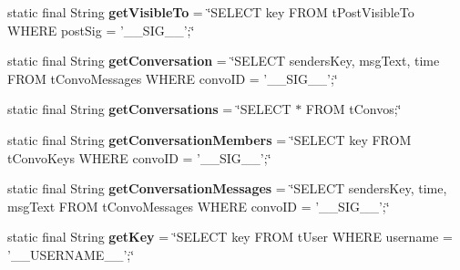 \begin{DoxyCompactItemize}
\item 
\hypertarget{classballmerpeak_1_1turtlenet_1_1server_1_1DBStrings_a977f96408405a039b29ea0375f014129}{static final String {\bfseries get\-Visible\-To} = \char`\"{}S\-E\-L\-E\-C\-T key F\-R\-O\-M t\-Post\-Visible\-To W\-H\-E\-R\-E post\-Sig = '\-\_\-\-\_\-\-S\-I\-G\-\_\-\-\_\-';\char`\"{}}\label{classballmerpeak_1_1turtlenet_1_1server_1_1DBStrings_a977f96408405a039b29ea0375f014129}

\item 
\hypertarget{classballmerpeak_1_1turtlenet_1_1server_1_1DBStrings_a764e619962ecc020606b3f8b2f3068dd}{static final String {\bfseries get\-Conversation} = \char`\"{}S\-E\-L\-E\-C\-T senders\-Key, msg\-Text, time F\-R\-O\-M t\-Convo\-Messages W\-H\-E\-R\-E convo\-I\-D = '\-\_\-\-\_\-\-S\-I\-G\-\_\-\-\_\-';\char`\"{}}\label{classballmerpeak_1_1turtlenet_1_1server_1_1DBStrings_a764e619962ecc020606b3f8b2f3068dd}

\item 
\hypertarget{classballmerpeak_1_1turtlenet_1_1server_1_1DBStrings_a329ba6510f891c7ff5a45117bb13c46f}{static final String {\bfseries get\-Conversations} = \char`\"{}S\-E\-L\-E\-C\-T $\ast$ F\-R\-O\-M t\-Convos;\char`\"{}}\label{classballmerpeak_1_1turtlenet_1_1server_1_1DBStrings_a329ba6510f891c7ff5a45117bb13c46f}

\item 
\hypertarget{classballmerpeak_1_1turtlenet_1_1server_1_1DBStrings_adb5c2853326eef2b392ebcdf237c66b0}{static final String {\bfseries get\-Conversation\-Members} = \char`\"{}S\-E\-L\-E\-C\-T key F\-R\-O\-M t\-Convo\-Keys W\-H\-E\-R\-E convo\-I\-D = '\-\_\-\-\_\-\-S\-I\-G\-\_\-\-\_\-';\char`\"{}}\label{classballmerpeak_1_1turtlenet_1_1server_1_1DBStrings_adb5c2853326eef2b392ebcdf237c66b0}

\item 
\hypertarget{classballmerpeak_1_1turtlenet_1_1server_1_1DBStrings_a181d0ea3e7576342fa2c4d22fde126d8}{static final String {\bfseries get\-Conversation\-Messages} = \char`\"{}S\-E\-L\-E\-C\-T senders\-Key, time, msg\-Text F\-R\-O\-M t\-Convo\-Messages W\-H\-E\-R\-E convo\-I\-D = '\-\_\-\-\_\-\-S\-I\-G\-\_\-\-\_\-';\char`\"{}}\label{classballmerpeak_1_1turtlenet_1_1server_1_1DBStrings_a181d0ea3e7576342fa2c4d22fde126d8}

\item 
\hypertarget{classballmerpeak_1_1turtlenet_1_1server_1_1DBStrings_ad9a4d662e135722a93cd5b5b37839e84}{static final String {\bfseries get\-Key} = \char`\"{}S\-E\-L\-E\-C\-T key F\-R\-O\-M t\-User W\-H\-E\-R\-E username = '\-\_\-\-\_\-\-U\-S\-E\-R\-N\-A\-M\-E\-\_\-\-\_\-';\char`\"{}}\label{classballmerpeak_1_1turtlenet_1_1server_1_1DBStrings_ad9a4d662e135722a93cd5b5b37839e84}


\end{DoxyCompactItemize}
